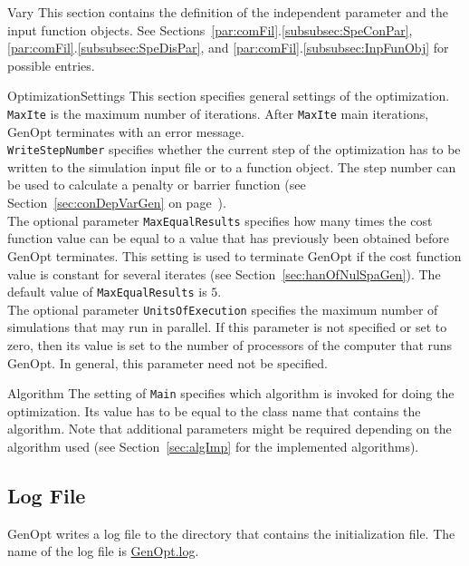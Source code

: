 \begin{codedescription}

\item [Vary] This section contains the definition of the independent parameter
and the input function objects.
See Sections~\ref{par:comFil}.\ref{subsubsec:SpeConPar}, \ref{par:comFil}.\ref{subsubsec:SpeDisPar},
and \ref{par:comFil}.\ref{subsubsec:InpFunObj} for possible entries.

\item[OptimizationSettings] This section specifies general settings of the optimization. \verb$MaxIte$ is the maximum number of iterations.
After \verb$MaxIte$ main iterations,
GenOpt terminates with an error message.\\
\verb$WriteStepNumber$ specifies whether the current step 
of the optimization has to be written to the simulation input file or to a function object.
The step number can be used to calculate a penalty or barrier function
(see Section~\ref{sec:conDepVarGen} on page~\pageref{sec:conDepVarGen}).\\
The optional parameter \verb$MaxEqualResults$ specifies how many times 
the cost function value can be equal to a value that has previously been obtained 
before GenOpt terminates. 
This setting is used to terminate GenOpt if the cost function value
is constant for several iterates (see Section~\ref{sec:hanOfNulSpaGen}).
The default value of \verb$MaxEqualResults$ is $5$.\\
The optional parameter \verb$UnitsOfExecution$ specifies the maximum number of simulations
that may run in parallel. If this parameter is not specified or set to zero, then its value is set to
the number of processors of the computer that runs GenOpt. In general, this parameter need
not be specified.

\item[Algorithm] The setting of \verb$Main$ specifies which algorithm is invoked for doing the optimization.
Its value has to be equal to the class name that contains the algorithm. Note that additional parameters might be required depending on the algorithm used (see Section~\ref{sec:algImp} for the implemented algorithms).
\end{codedescription}

\subsection{Log File}
GenOpt writes a log file to the directory that contains the initialization file. The name of the log file is \url{GenOpt.log}.

